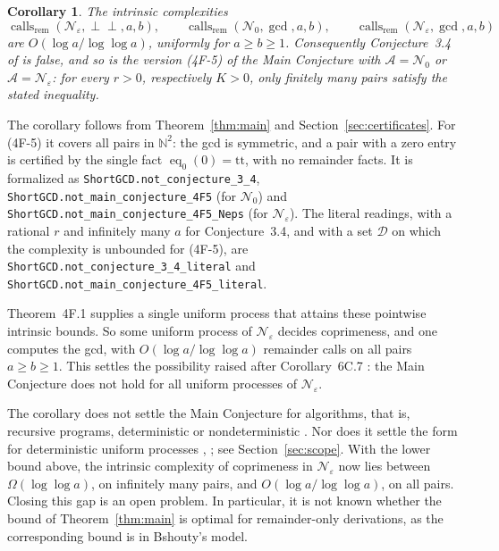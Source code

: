 \documentclass[11pt]{article}
\newtheorem{corollary}[theorem]{Corollary}
\newcommand{\rem}{\operatorname{rem}}
\newcommand{\calls}{\operatorname{calls}}
\newcommand{\eq}{\operatorname{eq}}
\newcommand{\lean}[1]{\nolinkurl{#1}}
\begin{document}
\begin{corollary}\label{cor:refute}
The intrinsic complexities
\[
\calls_{\rem}(\mathcal N_\varepsilon,\perp\!\!\!\perp,a,b),\qquad
\calls_{\rem}(\mathcal N_0,\gcd,a,b),\qquad
\calls_{\rem}(\mathcal N_\varepsilon,\gcd,a,b)
\]
are $O(\log a/\log\log a)$, uniformly for $a\geq b\geq1$. Consequently Conjecture~3.4 of
\cite{moschovakis2012} is false, and so is the version (4F-5) of the Main
Conjecture with $\mathcal A=\mathcal N_0$ or $\mathcal A=\mathcal N_\varepsilon$:
for every $r>0$, respectively $K>0$, only finitely many pairs satisfy the stated
inequality.
\end{corollary}
The corollary follows from Theorem~\ref{thm:main} and
Section~\ref{sec:certificates}. For (4F-5) it covers all pairs in
$\mathbb N^2$: the gcd is symmetric, and a pair with a zero entry is certified by
the single fact $\eq_0(0)=\mathrm{tt}$, with no remainder facts. It is
formalized as \lean{ShortGCD.not_conjecture_3_4},
\lean{ShortGCD.not_main_conjecture_4F5} (for $\mathcal N_0$) and
\lean{ShortGCD.not_main_conjecture_4F5_Neps} (for $\mathcal N_\varepsilon$).
The literal readings, with a rational $r$ and infinitely many $a$ for
Conjecture~3.4, and with a set $\mathcal D$ on which the complexity is unbounded
for (4F-5), are \lean{ShortGCD.not_conjecture_3_4_literal} and
\lean{ShortGCD.not_main_conjecture_4F5_literal}.

Theorem~4F.1 \cite[pp.~149--150]{moschovakis2019} supplies a single uniform
process that attains these pointwise intrinsic bounds. So some uniform process
of $\mathcal N_\varepsilon$ decides coprimeness, and one computes the gcd, with
$O(\log a/\log\log a)$ remainder calls on all pairs $a\geq b\geq1$. This settles
the possibility
raised after Corollary~6C.7 \cite[p.~188]{moschovakis2019}: the Main Conjecture
does not hold for all uniform processes of $\mathcal N_\varepsilon$.

The corollary does not settle the Main Conjecture for algorithms, that is,
recursive programs, deterministic or nondeterministic
\cite[p.~2]{moschovakis2019}. Nor does it settle the form for deterministic
uniform processes \cite[Conjecture~3.9]{moschovakis2012},
\cite[\S4H and p.~188]{moschovakis2019}; see Section~\ref{sec:scope}. With the lower bound above, the intrinsic complexity
of coprimeness in $\mathcal N_\varepsilon$ now lies between $\Omega(\log\log a)$,
on infinitely many pairs, and $O(\log a/\log\log a)$, on all pairs. Closing this
gap is an open problem. In particular, it is not known whether the bound of
Theorem~\ref{thm:main} is optimal for remainder-only derivations, as the
corresponding bound is in Bshouty's model.
\end{document}

